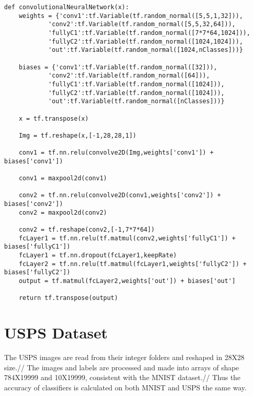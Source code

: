 \documentclass[a4paper,11pt]{article}
\begin{document}
\begin{lstlisting}[label={list:second}]
def convolutionalNeuralNetwork(x):
	weights = {'conv1':tf.Variable(tf.random_normal([5,5,1,32])),
			'conv2':tf.Variable(tf.random_normal([5,5,32,64])),
			'fullyC1':tf.Variable(tf.random_normal([7*7*64,1024])),
			'fullyC2':tf.Variable(tf.random_normal([1024,1024])),
			'out':tf.Variable(tf.random_normal([1024,nClasses]))}
	
	biases = {'conv1':tf.Variable(tf.random_normal([32])),
			'conv2':tf.Variable(tf.random_normal([64])),
			'fullyC1':tf.Variable(tf.random_normal([1024])),
			'fullyC2':tf.Variable(tf.random_normal([1024])),
			'out':tf.Variable(tf.random_normal([nClasses]))}
	
	x = tf.transpose(x)
	
	Img = tf.reshape(x,[-1,28,28,1])
	
	conv1 = tf.nn.relu(convolve2D(Img,weights['conv1']) + biases['conv1'])
	
	conv1 = maxpool2d(conv1)
	
	conv2 = tf.nn.relu(convolve2D(conv1,weights['conv2']) + biases['conv2'])
	conv2 = maxpool2d(conv2)
	
	conv2 = tf.reshape(conv2,[-1,7*7*64])
	fcLayer1 = tf.nn.relu(tf.matmul(conv2,weights['fullyC1']) + biases['fullyC1'])
	fcLayer1 = tf.nn.dropout(fcLayer1,keepRate)
	fcLayer2 = tf.nn.relu(tf.matmul(fcLayer1,weights['fullyC2']) + biases['fullyC2'])
	output = tf.matmul(fcLayer2,weights['out']) + biases['out']
	
	return tf.transpose(output)
\end{lstlisting}

\section*{USPS Dataset}

The USPS images are read from their integer folders and reshaped in 28X28 size.//
The images and labels are processed and made into arrays of shape 784X19999 and 10X19999, consistent with the MNIST dataset.//
Thus the accuracy of classifiers is calculated on both MNIST and USPS the same way.
\end{document}
